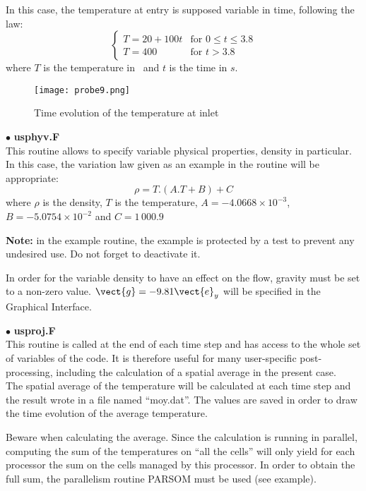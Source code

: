 In this case, the temperature at entry is supposed variable in time, following
the law:
\begin{equation}
\left\{\begin{array}{ll}
T = 20 + 100t & \text{for }0\leqslant t \leqslant 3.8\\
T = 400 & \text{for } t > 3.8
\end{array}\right.
\end{equation}
where $T$ is the temperature in \degresC\ and $t$ is the time in $s$.


\begin{figure}[h!]
\begin{center}
\texttt{[image: probe9.png]}
\caption{Time evolution of the temperature at inlet}
\label{figp9_e4}
\end{center}
\end{figure}


$\bullet$ {\bfseries usphyv.F}\\
This routine allows to specify variable physical properties, density in
particular. In this case, the variation law given as an example in the routine
will be appropriate:
\begin{equation}
\rho = T.(A.T + B) + C
\end{equation}
where $\rho$ is the density, $T$ is the temperature, $A = -4.0668\times10^{-3}$,
$B =-5.0754\times 10^{-2}$ and $C = 1\,000.9$

\textbf{Note:} in the example routine, the example is protected by a test to prevent any
undesired use. Do not forget to deactivate it.

In order for the variable density to have an effect on the flow, gravity must be
set to a non-zero value. $\vect{g} = -9.81 \vect{e}_y$ will be specified in the
Graphical Interface.


$\bullet$ {\bfseries usproj.F}\\
This routine is called at the end of each time step and has access to the whole
set of variables of the code. It is therefore useful for many user-specific
post-processing, including the calculation of a spatial average in the present
case.\\
The spatial average of the temperature will be calculated at each time step and
the result wrote in a file named ``moy.dat''. The values are saved in order
to draw the time evolution of the average temperature.

Beware when calculating the average. Since the calculation is running in
parallel, computing the sum of the temperatures on ``all the cells'' will only
yield for each processor the sum on the cells managed by this processor. In
order to obtain the full sum, the parallelism routine PARSOM must be used (see
example).


